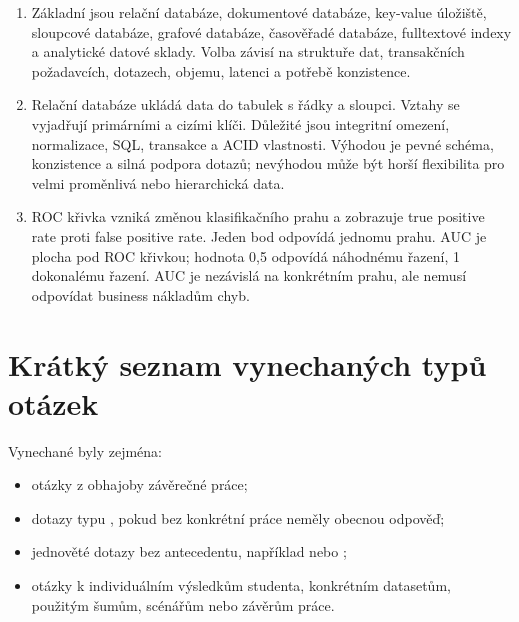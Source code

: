 \documentclass[12pt,a4paper]{article}
\begin{document}
\begin{enumerate}
  \item {}

  Základní jsou relační databáze, dokumentové databáze, key-value úložiště, sloupcové databáze,
  grafové databáze, časověřadé databáze, fulltextové indexy a analytické datové sklady. Volba závisí
  na struktuře dat, transakčních požadavcích, dotazech, objemu, latenci a potřebě konzistence.

  \item {}

  Relační databáze ukládá data do tabulek s řádky a sloupci. Vztahy se vyjadřují primárními a cizími
  klíči. Důležité jsou integritní omezení, normalizace, SQL, transakce a ACID vlastnosti. Výhodou je
  pevné schéma, konzistence a silná podpora dotazů; nevýhodou může být horší flexibilita pro velmi
  proměnlivá nebo hierarchická data.

  \item {}

  ROC křivka vzniká změnou klasifikačního prahu a zobrazuje true positive rate proti false positive
  rate. Jeden bod odpovídá jednomu prahu. AUC je plocha pod ROC křivkou; hodnota 0,5 odpovídá náhodnému
  řazení, 1 dokonalému řazení. AUC je nezávislá na konkrétním prahu, ale nemusí odpovídat business
  nákladům chyb.
\end{enumerate}

\section*{Krátký seznam vynechaných typů otázek}

Vynechané byly zejména:
\begin{itemize}
  \item otázky z obhajoby závěrečné práce;
  \item dotazy typu , pokud bez konkrétní práce neměly obecnou
  odpověď;
  \item jednověté dotazy bez antecedentu, například  nebo ;
  \item otázky k individuálním výsledkům studenta, konkrétním datasetům, použitým šumům, scénářům
  nebo závěrům práce.
\end{itemize}
\end{document}
